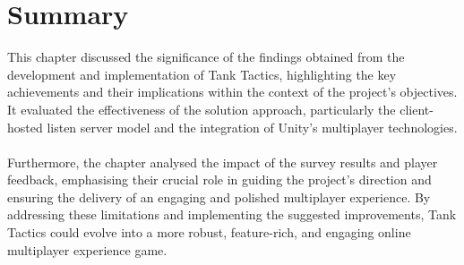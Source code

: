 \section{Summary}
This chapter discussed the significance of the findings obtained from the development and implementation of Tank Tactics, highlighting the key achievements and their implications within the context of the project's objectives. It evaluated the effectiveness of the solution approach, particularly the client-hosted listen server model and the integration of Unity's multiplayer technologies.
\\
\noindent
\\
Furthermore, the chapter analysed the impact of the survey results and player feedback, emphasising their crucial role in guiding the project's direction and ensuring the delivery of an engaging and polished multiplayer experience. By addressing these limitations and implementing the suggested improvements, Tank Tactics could evolve into a more robust, feature-rich, and engaging online multiplayer experience game.